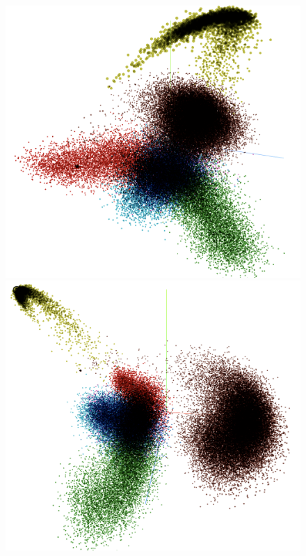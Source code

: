 \vspace*{\baselineskip}
\begin{figure}[H]
  \centering
  \begin{threeparttable}
  \begin{minipage}[b]{0.45\linewidth}
    \includegraphics[width=\textwidth]{figures_new/from_old/pca_embedding_projector}
  \end{minipage}
  \quad
  \begin{minipage}[b]{0.45\linewidth}
    \includegraphics[width=\textwidth]{figures_new/from_old/pca_embedding_projector_2}

\end{minipage}
\end{threeparttable}
\end{figure}
